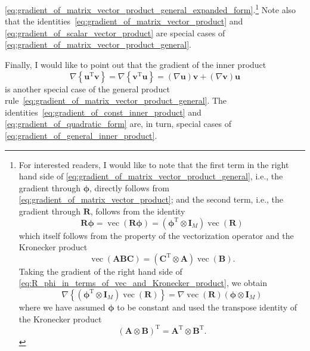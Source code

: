 \documentclass[12pt,a4paper]{article}
\begin{document}
\eqref{eq:gradient_of_matrix_vector_product_general_expanded_form}.\footnote{%
For interested readers, I would like to note that
the first term in the right hand side of
\eqref{eq:gradient_of_matrix_vector_product_general},
i.e., the gradient through $\bm{\phi}$, directly follows from
\eqref{eq:gradient_of_matrix_vector_product}; and
the second term, i.e., the gradient through $\mathbf{R}$, follows from the identity
\begin{equation}
\mathbf{R} \bm{\phi} = \operatorname{vec} \left( \mathbf{R} \bm{\phi} \right)
= \left( \bm{\phi}^{\operatorname{T}} \otimes \mathbf{I}_M \right)
\operatorname{vec} \left( \mathbf{R} \right)
\label{eq:R_phi_in_terms_of_vec_and_Kronecker_product}
\end{equation}
which itself follows from the property of the vectorization operator and the Kronecker product~%
\citep{MagnusNeudecker:MDC}
\begin{equation}
\operatorname{vec}\left( \mathbf{A} \mathbf{B} \mathbf{C} \right)
= \left( \mathbf{C}^{\operatorname{T}} \otimes \mathbf{A} \right)
\operatorname{vec}\left( \mathbf{B} \right) .
\end{equation}
Taking the gradient of the right hand side of
\eqref{eq:R_phi_in_terms_of_vec_and_Kronecker_product},
we obtain
\begin{equation}
\nabla
\left\{
\left( \bm{\phi}^{\operatorname{T}} \otimes \mathbf{I}_M \right)
\operatorname{vec} \left( \mathbf{R} \right)
\right\}
=
\nabla
\operatorname{vec} \left( \mathbf{R} \right)
\left( \bm{\phi} \otimes \mathbf{I}_M \right)
\end{equation}
where we have assumed $\bm{\phi}$ to be constant and
used the transpose identity of the Kronecker product~\citep{MagnusNeudecker:MDC}
\begin{equation}
\left(\mathbf{A}\otimes\mathbf{B}\right)^{\operatorname{T}} =
\mathbf{A}^{\operatorname{T}} \otimes \mathbf{B}^{\operatorname{T}} .
\end{equation}
}
Note also that
the identities~\eqref{eq:gradient_of_matrix_vector_product} and
\eqref{eq:gradient_of_scalar_vector_product}
are special cases of
\eqref{eq:gradient_of_matrix_vector_product_general}.

Finally, I would like to point out that the gradient of the inner product
\begin{equation}
\nabla \left\{ \mathbf{u}^{\operatorname{T}} \mathbf{v} \right\} =
\nabla \left\{ \mathbf{v}^{\operatorname{T}} \mathbf{u} \right\} =
\left(\nabla\mathbf{u}\right) \mathbf{v} +
\left(\nabla\mathbf{v}\right) \mathbf{u}
\label{eq:gradient_of_general_inner_product}
\end{equation}
is another special case of
the general product rule~\eqref{eq:gradient_of_matrix_vector_product_general}.
The identities~\eqref{eq:gradient_of_const_inner_product} and
\eqref{eq:gradient_of_quadratic_form}
are, in turn, special cases of \eqref{eq:gradient_of_general_inner_product}.
\end{document}
